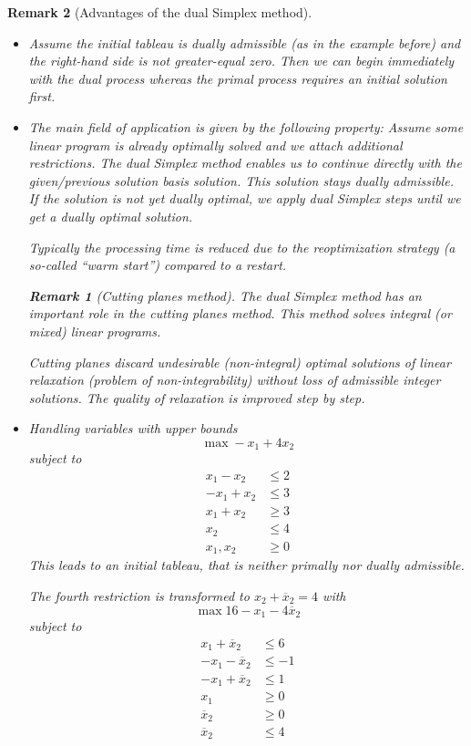 \documentclass[a4paper]{article}
\numberwithin{lecref}{section}
\newtheorem*{Remark}{Remark}
\begin{document}
\begin{Remark}[Advantages of the dual Simplex method]
	\begin{itemize}
		\item Assume the initial tableau is dually admissible (as in the example before) and the right-hand side is not greater-equal zero.
			Then we can begin immediately with the dual process whereas the primal process requires an initial solution first.
		\item The main field of application is given by the following property:
			Assume some linear program is already optimally solved and we attach additional restrictions.
			The dual Simplex method enables us to continue directly with the given/previous solution basis solution. This solution stays dually admissible.
			If the solution is not yet dually optimal, we apply dual Simplex steps until we get a dually optimal solution.

			Typically the processing time is reduced due to the reoptimization strategy (a so-called \enquote{warm start}) compared to a restart.

			\begin{Remark}[Cutting planes method]
				The dual Simplex method has an important role in the cutting planes method.
				This method solves integral (or mixed) linear programs.

				Cutting planes discard undesirable (non-integral) optimal solutions of linear relaxation (problem of non-integrability) without loss of admissible integer solutions.
				The quality of relaxation is improved step by step.
			\end{Remark}
		\item Handling variables with upper bounds
			\[ \max -x_1 + 4 x_2 \]
			subject to
			\begin{align*}
				x_1 - x_2 &\leq 2 \\
				-x_1 + x_2 &\leq 3 \\
				x_1 + x_2 &\geq 3 \\
				x_2 &\leq 4 \\
				x_1, x_2 &\geq 0
			\end{align*}
			This leads to an initial tableau, that is neither primally nor dually admissible.

			The fourth restriction is transformed to $x_2 + \overline{x}_2 = 4$ with
			\[ \max 16 - x_1 - 4\overline{x}_2 \]
			subject to
			\begin{align*}
				x_1 + \overline{x}_2 &\leq 6 \\
				-x_1 - \overline{x}_2 &\leq -1 \\
				-x_1 + \overline{x}_2 &\leq 1 \\
				x_1 &\geq 0 \\
				\overline x_2 &\geq 0 \\
				\overline x_2 &\leq 4
			\end{align*}


\end{itemize}
\end{Remark}
\end{document}
